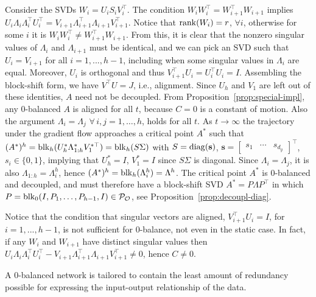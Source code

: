 \documentclass{article}
\makeatletter
\renewenvironment{proof}[1][\proofname]{
  \par\pushQED{\qed}\normalfont
  \topsep6\p@\@plus6\p@\relax
  \trivlist\item[\hskip\labelsep\bfseries#1\@addpunct{.}]
  \ignorespaces
}{
  \popQED\endtrivlist\@endpefalse
}
\def\diag{{\rm diag}}
\def\rank{{\rm rank}}
\def\block{{\rm blk}}
\newcommand{\1}{\mathds{1}}
\makeatother
\begin{document}
\begin{proof}
Consider the SVDs $ W_i = U_i S_i V_i^\top $. The condition $ W_i W_i^\top = W_{i+1}^\top W_{i+1} $ implies $U_i \Lambda_i \Lambda_i^\top U_i^\top = V_{i+1} \Lambda_{i+1}^\top \Lambda_{i+1} V_{i+1}^\top $.
Notice that $ \rank ( W_i ) = r$, $ \forall i $, otherwise for some $ i $ it is $ W_i W_i^\top \neq W_{i+1}^\top W_{i+1} $.
From this, it is clear that the nonzero singular values of $ \Lambda_i $ and $ \Lambda_{i+1} $ must be identical, and we can pick an SVD such that $ U_i = V_{i+1} $ for all $ i = 1,...,h-1 $, including when some singular values in $ \Lambda_i $ are equal.
Moreover, $ U_i $ is orthogonal and thus $ V_{i+1}^\top U_i = U_i^\top U_i = I $. Assembling the block-shift form, we have $ V^\top U = J$, i.e., alignment. Since $ U_h $ and $ V_1 $ are left out of these identities, $A$ need not be decoupled.
From Proposition~\ref{prop:special-impl}, any 0-balanced $ A $ is aligned for all $ t $, because $ C = 0$ is a constant of motion. 
Also the argument $ \Lambda_i = \Lambda_j $ $ \forall \, i,j = 1, \ldots, h$, holds for all $t$.
As $ t \rightarrow \infty $ the trajectory under the gradient flow approaches a critical point $ A^\ast $ such that $ ( A^\ast )^h = \block_h( U_h^\ast \Lambda_{1:h}^\ast V_1^{\ast \top} )=  \block_h( S \Sigma ) $ with $ S = \diag(\mathbf{s}) $, $ \mathbf{s} = \begin{bmatrix}
	s_1 & \cdots & s_{d_y}
\end{bmatrix}^\top $, $ s_i \in \{0,1\} $, implying that $ U_h^\ast = I $, $ V_1^\ast = I $ since $ S \Sigma $ is diagonal.
Since $ \Lambda_i = \Lambda_j$, it is also $ \Lambda_{1:h}=\Lambda_i^h$, hence $(A^\ast)^h = \block_h(\Lambda_i^h) = \Lambda^h$.
The critical point $ A^\ast $ is 0-balanced and decoupled, and must therefore have a block-shift SVD $A^\ast = P \Lambda P^\top  $ in which $ P=\block_0 (I, P_1, \ldots, P_{h-1}, I) \in \mathcal{P_O}$, see Proposition~\ref{prop:decoupl-diag}.
\end{proof}

Notice that the condition that singular vectors are aligned, $ V_{i+1}^\top U_i = I $, for $ i=1,...,h-1 $, is not sufficient for 0-balance, not even in the static case. In fact, if any $ W_i $ and $ W_{i+1} $ have distinct singular values then $ U_i \Lambda_i \Lambda_i^\top U_i^\top - V_{i+1} \Lambda_{i+1}^\top \Lambda_{i+1} V_{i+1}^\top \neq 0 $, hence $ C \neq 0 $.

A 0-balanced network is tailored to contain the least amount of redundancy possible for expressing the input-output relationship of the data. 
\end{document}
